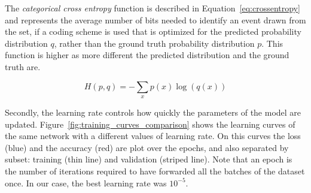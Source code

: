 The \textit{categorical cross entropy} function is described in Equation~\ref{eq:crossentropy} and represents the average number of bits needed to identify an event drawn from the set, if a coding scheme is used that is optimized for the predicted probability distribution $q$, rather than the ground truth probability distribution $p$. This function is higher as more different the predicted distribution and the ground truth are.%

\begin{equation}
\label{eq:crossentropy}
	H(p,q) = - \sum_x p(x) \log(q(x))
\end{equation}

Secondly, the learning rate controls how quickly the parameters of the model are updated.
Figure~\ref{fig:training_curves_comparison} shows the learning curves of the same network with a different values of learning rate. On this curves the loss (blue) and the accuracy (red) are plot over the epochs, and also separated by subset: training (thin line) and validation (striped line). Note that an epoch is the number of iterations required to have forwarded all the batches of the dataset once. In our case, the best learning rate was $10^{-5}$. %




